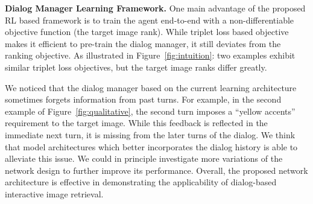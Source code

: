 \textbf{Dialog Manager Learning Framework.} One main advantage of the proposed 
RL based framework is to train the agent end-to-end
with a non-differentiable objective function (the target image rank).
While triplet loss based objective makes it efficient to pre-train the dialog
manager, it still deviates from the ranking objective. 
As illustrated in Figure~\ref{fig:intuition}: two examples exhibit similar triplet loss 
objectives, but the target image ranks differ greatly. 


We noticed that the dialog manager based on the current learning architecture 
sometimes forgets information from past 
turns. For example, in the second example of Figure~\ref{fig:qualitative}, the
second turn imposes a ``yellow accents'' requirement to the target image. 
While this feedback is reflected in the immediate next turn, it is missing
from the later turns of the dialog. We think that model architectures which 
better incorporates the dialog history is able to alleviate this issue.
We could in principle investigate more variations of the network 
design to further improve its performance. Overall, the proposed network 
architecture is effective in demonstrating the applicability of dialog-based 
interactive image retrieval.







